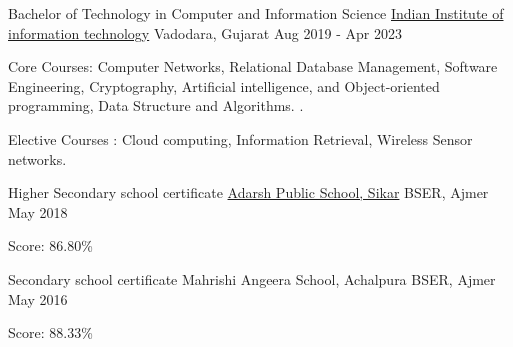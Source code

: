 \begin{cventries}
  \cventry
    {Bachelor of Technology in Computer and Information Science}
    {\href{http://iiitvadodara.ac.in/}{Indian Institute of information technology}}
    {Vadodara, Gujarat}
    {Aug 2019 - Apr 2023}
    {
      \begin{cvitems}
        \item {Core Courses: Computer Networks, Relational Database Management, Software Engineering, Cryptography, Artificial intelligence,  and Object-oriented programming, Data Structure and Algorithms.
.}
        \item {Elective Courses : Cloud computing, Information Retrieval, Wireless Sensor networks. }
      \end{cvitems}
    }
   
     \cventry
    {Higher Secondary school certificate}
    {\href{https://apssikar.com/}{Adarsh Public School, Sikar}}
    {BSER, Ajmer}
    {May 2018}
    {
      \begin{cvitems}
        \item {Score: 86.80\%}
      \end{cvitems}
    }
    
    \cventry
    {Secondary school certificate}
    {Mahrishi Angeera School, Achalpura}
    {BSER, Ajmer}
    {May 2016}
    {
      \begin{cvitems}
        \item {Score: 88.33\%}
      \end{cvitems}
    }

\end{cventries}
